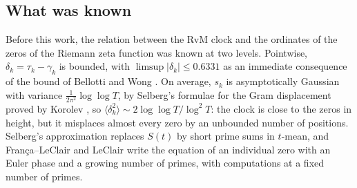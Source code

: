 \documentclass[preprint,12pt]{elsarticle}
\numberwithin{equation}{section}
\theoremstyle{plain}
\theoremstyle{definition}
\theoremstyle{remark}
\begin{document}
\subsection{What was known}
Before this work, the relation between the RvM clock and the ordinates of the zeros of the Riemann zeta function was known at two levels. Pointwise, $\delta_k=\tau_k-\gamma_k$ is bounded, with $\limsup|\delta_k|\le0.6331$ as an immediate consequence of the bound of Bellotti and Wong \cite{BellottiWong2025}. On average, $s_k$ is asymptotically Gaussian with variance $\frac1{2\pi^2}\log\log T$, by Selberg's formulae for the Gram displacement proved by Korolev \cite{Korolev2012,Korolev2011}, so $\langle\delta_k^2\rangle\sim2\log\log T/\log^2T$: the clock is close to the zeros in height, but it misplaces almost every zero by an unbounded number of positions. Selberg's approximation \cite{Selberg1946a,Fujii1974} replaces $S(t)$ by short prime sums in $t$-mean, and Fran\c{c}a--LeClair and LeClair \cite{FrancaLeClair2015,LeClair2021} write the equation of an individual zero with an Euler phase and a growing number of primes, with computations at a fixed number of primes.
\end{document}
